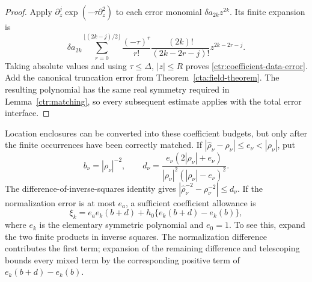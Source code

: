 \begin{proof}
Apply $\partial_z^j\exp(-\tau\partial_z^2)$ to each error monomial
$\delta a_{2k}z^{2k}$. Its finite expansion is
\[
 \delta a_{2k}\sum_{r=0}^{\lfloor(2k-j)/2\rfloor}
 \frac{(-\tau)^r}{r!}\frac{(2k)!}{(2k-2r-j)!}z^{2k-2r-j}.
\]
Taking absolute values and using $\tau\le\Delta$, $|z|\le R$
proves \eqref{ctr:coefficient-data-error}. Add the canonical truncation
error from Theorem~\ref{cta:field-theorem}. The resulting polynomial
has the same real symmetry required in Lemma~\ref{ctr:matching}, so
every subsequent estimate applies with the total error interface.
\end{proof}

Location enclosures can be converted into these coefficient budgets,
but only after the finite occurrences have been correctly matched.
If $|\widehat\rho_\nu-\rho_\nu|\le e_\nu<|\rho_\nu|$, put
\begin{equation}
 b_\nu=|\rho_\nu|^{-2},\qquad
 d_\nu=\frac{e_\nu(2|\rho_\nu|+e_\nu)}
               {|\rho_\nu|^2(|\rho_\nu|-e_\nu)^2}.
 \label{ctr:root-data-error}
\end{equation}
The difference-of-inverse-squares identity gives
$|\widehat\rho_\nu^{-2}-\rho_\nu^{-2}|\le d_\nu$.
If the normalization error is at most $e_a$, a sufficient coefficient
allowance is
\begin{equation}
 \xi_k=e_a e_k(b+d)+h_0\{e_k(b+d)-e_k(b)\},
 \label{ctr:symmetric-data-error}
\end{equation}
where $e_k$ is the elementary symmetric polynomial and $e_0=1$.
To see this, expand the two finite products in inverse squares. The
normalization difference contributes the first term; expansion of the
remaining difference and telescoping bounds every mixed term by the
corresponding positive term of $e_k(b+d)-e_k(b)$.


